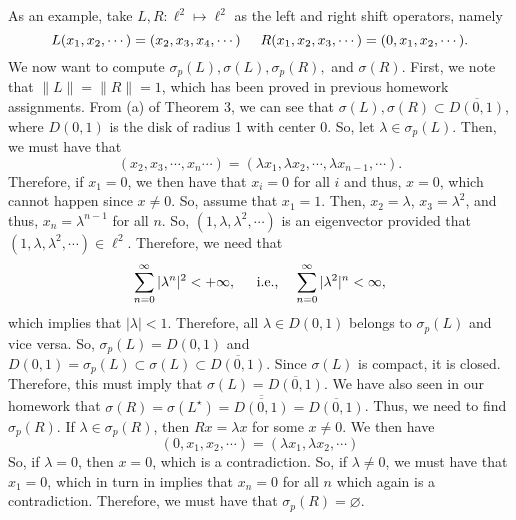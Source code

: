 \documentclass[12pt]{article}
\newcommand{\sumo}{\sum\limits_{n = 0}^{\infty}}
\newcommand{\ov}{\overline}
\newcommand{\sbs}{\subset}
\begin{document}
\vspace{-25pt}
As an example, take $L, R :\ell^2 \mapsto \ell^2$ as the left and right shift operators, namely
\[ L(x_1, x_2, \cdots) = (x_2, x_3, x_4, \cdots) \hspace{5mm} R(x_1, x_2, x_3, \cdots) = (0, x_1, x_2, \cdots).\]
We now want to compute $\sigma_p(L), \sigma(L), \sigma_p(R),$ and $\sigma(R)$. First, we note that $\| L \| = \| R \| = 1$, which has been proved in previous homework assignments. From (a) of Theorem 3, we can see that $\sigma(L), \sigma(R) \sbs \ov{D(0, 1)}$, where $D(0, 1)$ is the disk of radius 1 with center 0. So, let $\lambda \in \sigma_p(L)$. Then, we must have that 
\[ (x_2, x_3, \cdots, x_n \cdots) = (\lambda x_1, \lambda x_2, \cdots, \lambda x_{n -1}, \cdots ).\]
Therefore, if $x_1 = 0$, we then have that $x_i = 0$ for all $i$ and thus, $x = 0$, which cannot happen since $x \neq 0$. So, assume that $x_1 = 1$. Then, $x_2 = \lambda$, $x_3= \lambda^2$, and thus, $x_n = \lambda^{n-1}$ for all $n$. So, $(1, \lambda, \lambda^2, \cdots)$ is an eigenvector provided that $(1, \lambda, \lambda^2, \cdots) \in \ell^2$. Therefore, we need that 
\[ \sumo |\lambda^n|^2 < + \infty, \hspace{4mm} \text{ i.e.,} \hspace{4mm} \sumo |\lambda^2|^n < \infty,\]
which implies that $|\lambda |< 1$. Therefore, all $\lambda \in D(0, 1)$ belongs to $\sigma_p(L)$ and vice versa. So, $\sigma_p(L) = D(0,1)$ and $D(0, 1) = \sigma_p(L) \sbs \sigma(L) \sbs \ov{D(0, 1)}$. Since $\sigma(L)$ is compact, it is closed. Therefore, this must imply that $\sigma(L) = \ov{D(0, 1)}$. We have also seen in our homework that $\sigma(R) = \sigma(L^{\star}) = \ov{\ov{D(0, 1)}} = \ov{D(0,1)}$. Thus, we need to find $\sigma_p(R)$. If $\lambda \in \sigma_p(R)$, then $Rx = \lambda x$ for some $x \neq 0$. We then have 
\[ (0, x_1, x_2, \cdots) = (\lambda x_1, \lambda x_2, \cdots)\]
So, if $\lambda = 0$, then $x = 0$, which is a contradiction. So, if $\lambda \neq 0$, we must have that $x_1 = 0$, which in turn in implies that $x_n = 0$ for all $n$ which again is a contradiction. Therefore, we must have that $\sigma_p(R) = \varnothing$.
\end{document}
